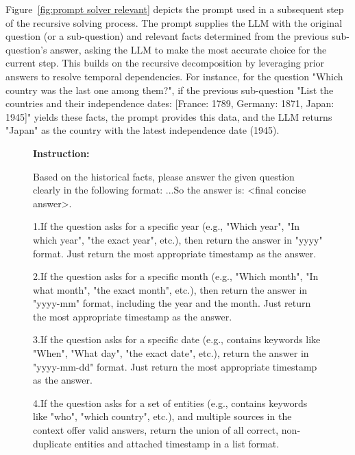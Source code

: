 \documentclass[11pt]{article}
\begin{document}
Figure~\ref{fig:prompt solver relevant} depicts the prompt used in a subsequent step of the recursive solving process. The prompt supplies the LLM with the original question (or a sub-question) and relevant facts determined from the previous sub-question’s answer, asking the LLM to make the most accurate choice for the current step. This builds on the recursive decomposition by leveraging prior answers to resolve temporal dependencies. For instance, for the question "Which country was the last one among them?", if the previous sub-question "List the countries and their independence dates: [France: 1789, Germany: 1871, Japan: 1945]" yields these facts, the prompt provides this data, and the LLM returns "Japan" as the country with the latest independence date (1945).
\begin{figure}[!h]
\begin{tcolorbox}[
    colback=black!10, 
    colframe=black!70, 
    boxrule=1pt, 
    arc=5mm, 
    boxsep=2mm, 
    left=5mm, 
    right=5mm, 
    top=5mm, 
    bottom=4mm,
    width=\textwidth, %
    nobeforeafter, %
    colupper=black %
]
{\small\sffamily %
\textbf{Instruction:} 

Based on the historical facts, please answer the given question clearly in the following format: ...So the answer is: <final concise answer>.

1.If the question asks for a specific year (e.g., "Which year", "In which year", "the exact year", etc.), then return the answer in "yyyy" format. Just return the most appropriate timestamp as the answer.

2.If the question asks for a specific month (e.g., "Which month", "In what month", "the exact month", etc.), then return the answer in "yyyy-mm" format, including the year and the month. Just return the most appropriate timestamp as the answer.

3.If the question asks for a specific date (e.g., contains keywords like "When", "What day", "the exact date", etc.), return the answer in "yyyy-mm-dd" format. Just return the most appropriate timestamp as the answer.

4.If the question asks for a set of entities (e.g., contains keywords like "who", "which country", etc.), and multiple sources in the context offer valid answers, return the union of all correct, non-duplicate entities and attached timestamp in a list format. 

}
\end{tcolorbox}
\end{figure}
\end{document}
